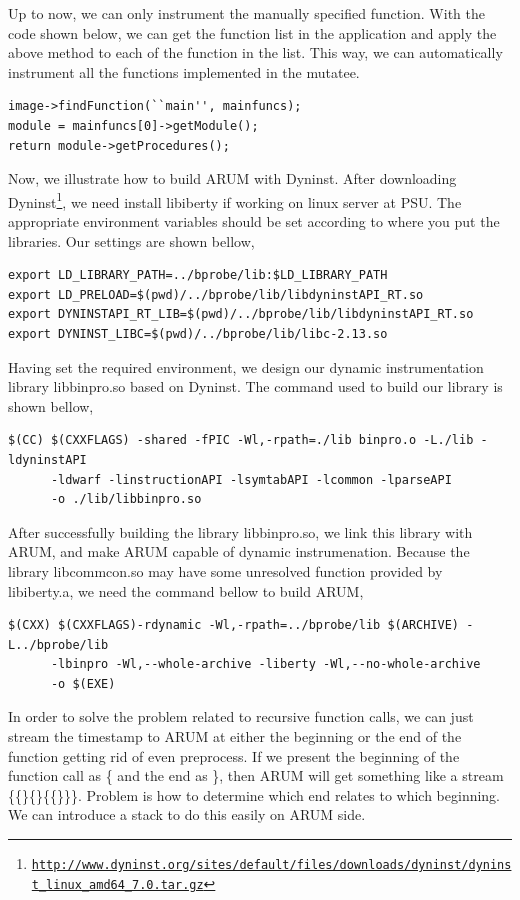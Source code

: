 \documentclass[11pt,letterpaper,oneside]{article}
\begin{document}
Up to now, we can only instrument the manually specified function. With the code shown below, we can get the function list in the application and apply the above method to each of the function in the list. This way, we can automatically instrument all the functions implemented in the mutatee.
\begin{Verbatim}[frame=single]
image->findFunction(``main'', mainfuncs);
module = mainfuncs[0]->getModule();
return module->getProcedures();
\end{Verbatim}

Now, we illustrate how to build ARUM with Dyninst. After downloading Dyninst\footnote{\texttt{\url{http://www.dyninst.org/sites/default/files/downloads/dyninst/dyninst_linux_amd64_7.0.tar.gz}}}, we need install libiberty if working on linux server at PSU. The appropriate environment variables should be set according to where you put the libraries. Our settings are shown bellow,

\begin{Verbatim}[frame=single]
export LD_LIBRARY_PATH=../bprobe/lib:$LD_LIBRARY_PATH
export LD_PRELOAD=$(pwd)/../bprobe/lib/libdyninstAPI_RT.so
export DYNINSTAPI_RT_LIB=$(pwd)/../bprobe/lib/libdyninstAPI_RT.so
export DYNINST_LIBC=$(pwd)/../bprobe/lib/libc-2.13.so
\end{Verbatim}

Having set the required environment, we design our dynamic instrumentation library libbinpro.so based on Dyninst. The command used to build our library is shown bellow,

\begin{Verbatim}[frame=single]
$(CC) $(CXXFLAGS) -shared -fPIC -Wl,-rpath=./lib binpro.o -L./lib -ldyninstAPI
      -ldwarf -linstructionAPI -lsymtabAPI -lcommon -lparseAPI
      -o ./lib/libbinpro.so
\end{Verbatim}

After successfully building the library libbinpro.so, we link this library with ARUM, and make ARUM capable of dynamic instrumenation. Because the library libcommcon.so may have some unresolved function provided by libiberty.a, we need the command bellow to build ARUM,

\begin{Verbatim}[frame=single]
$(CXX) $(CXXFLAGS)-rdynamic -Wl,-rpath=../bprobe/lib $(ARCHIVE) -L../bprobe/lib
      -lbinpro -Wl,--whole-archive -liberty -Wl,--no-whole-archive
      -o $(EXE)
\end{Verbatim}

In order to solve the problem related to recursive function calls, we can just stream the timestamp to ARUM at either the beginning or the end of the function getting rid of even preprocess. If we present the beginning of the function call as \{ and the end as \}, then ARUM will get something like a stream \{\{\}\{\}\{\{\}\}\}. Problem is how to determine which end relates to which beginning. We can introduce a stack to do this easily on ARUM side.
\end{document}
